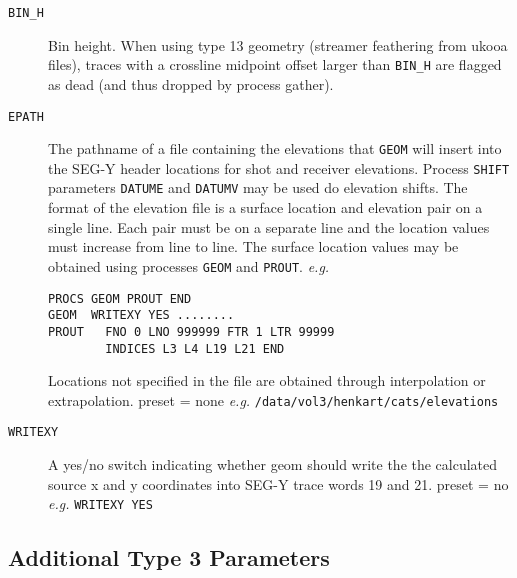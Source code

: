 \begin{description}
\item[\texttt{BIN\_H}] Bin height.  When using type 13 geometry (streamer feathering
         from \gls{ukooa} files), traces with a crossline midpoint offset
         larger than \texttt{BIN\_H} are flagged as dead (and thus dropped by
         process gather).

\item[\texttt{EPATH}] The pathname of a file containing the elevations that \texttt{GEOM}
         will insert into the SEG-Y header locations for \gls{shot} and
         receiver elevations.  Process \texttt{SHIFT} parameters \texttt{DATUME} and
         \texttt{DATUMV} may be used do elevation shifts.  The format of the
         elevation file is a surface location and elevation pair on
         a single line.  Each pair must be on a separate line and
         the location values must increase from line to line.  The
         surface location values may be obtained using processes \texttt{GEOM}
         and \texttt{PROUT}.  \textit{e.g.}
\begin{verbatim}
PROCS GEOM PROUT END
GEOM  WRITEXY YES ........
PROUT   FNO 0 LNO 999999 FTR 1 LTR 99999
        INDICES L3 L4 L19 L21 END
\end{verbatim}
         Locations not specified in the file are obtained through
         interpolation or extrapolation.
         \Gls{preset} = none    \textit{e.g.}  \texttt{/data/vol3/henkart/cats/elevations}

\item[\texttt{WRITEXY}] A yes/no switch indicating whether geom should write the
         the calculated source x and y coordinates into SEG-Y trace
         words 19 and 21.
         \Gls{preset} = no        \textit{e.g.} \texttt{WRITEXY YES}
\end{description}

\subsection{Additional Type 3 Parameters}

